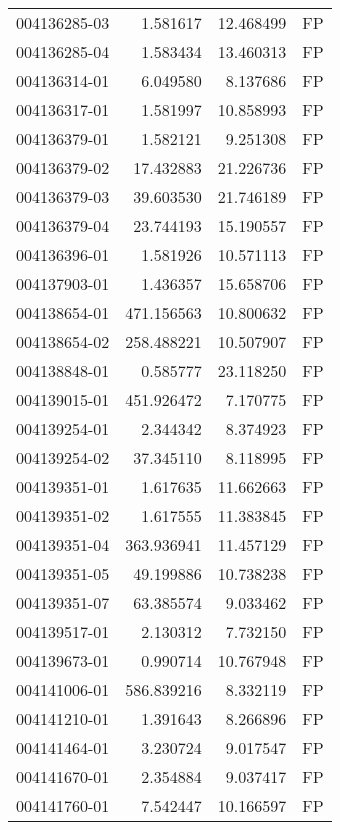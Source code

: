 \begin{tabular}{lrrl}
004136285-03 &    1.581617 &      12.468499 &   FP \\
004136285-04 &    1.583434 &      13.460313 &   FP \\
004136314-01 &    6.049580 &       8.137686 &   FP \\
004136317-01 &    1.581997 &      10.858993 &   FP \\
004136379-01 &    1.582121 &       9.251308 &   FP \\
004136379-02 &   17.432883 &      21.226736 &   FP \\
004136379-03 &   39.603530 &      21.746189 &   FP \\
004136379-04 &   23.744193 &      15.190557 &   FP \\
004136396-01 &    1.581926 &      10.571113 &   FP \\
004137903-01 &    1.436357 &      15.658706 &   FP \\
004138654-01 &  471.156563 &      10.800632 &   FP \\
004138654-02 &  258.488221 &      10.507907 &   FP \\
004138848-01 &    0.585777 &      23.118250 &   FP \\
004139015-01 &  451.926472 &       7.170775 &   FP \\
004139254-01 &    2.344342 &       8.374923 &   FP \\
004139254-02 &   37.345110 &       8.118995 &   FP \\
004139351-01 &    1.617635 &      11.662663 &   FP \\
004139351-02 &    1.617555 &      11.383845 &   FP \\
004139351-04 &  363.936941 &      11.457129 &   FP \\
004139351-05 &   49.199886 &      10.738238 &   FP \\
004139351-07 &   63.385574 &       9.033462 &   FP \\
004139517-01 &    2.130312 &       7.732150 &   FP \\
004139673-01 &    0.990714 &      10.767948 &   FP \\
004141006-01 &  586.839216 &       8.332119 &   FP \\
004141210-01 &    1.391643 &       8.266896 &   FP \\
004141464-01 &    3.230724 &       9.017547 &   FP \\
004141670-01 &    2.354884 &       9.037417 &   FP \\
004141760-01 &    7.542447 &      10.166597 &   FP \\

\end{tabular}
